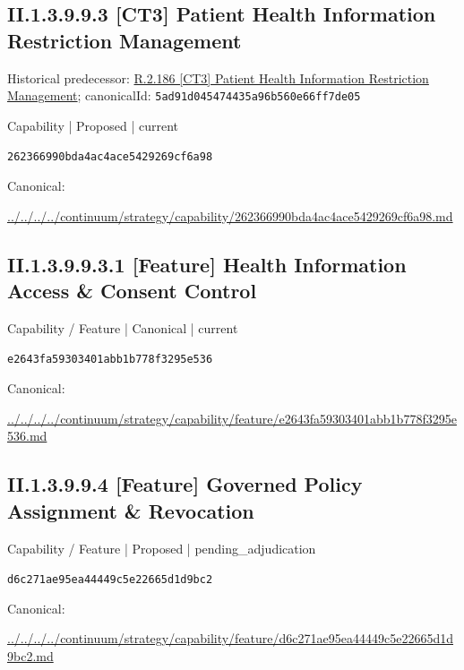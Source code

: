 \documentclass[10pt,a4paper]{article}
\begin{document}
\subsection*{II.1.3.9.9.3 [CT3] Patient Health Information Restriction Management}
Historical predecessor: \hyperref[element-5ad91d045474435a96b560e66ff7de05]{R.2.186 [CT3] Patient Health Information Restriction Management}; canonicalId: \texttt{5ad91d045474435a96b560e66ff7de05}\par
\label{element-262366990bda4ac4ace5429269cf6a98}
{\small Capability | Proposed | current}\par
\texttt{262366990bda4ac4ace5429269cf6a98}\par
Canonical: \par
{\footnotesize\url{../../../../continuum/strategy/capability/262366990bda4ac4ace5429269cf6a98.md}}\par
\subsection*{II.1.3.9.9.3.1 [Feature] Health Information Access \& Consent Control}
\label{element-e2643fa59303401abb1b778f3295e536}
{\small Capability / Feature | Canonical | current}\par
\texttt{e2643fa59303401abb1b778f3295e536}\par
Canonical: \par
{\footnotesize\url{../../../../continuum/strategy/capability/feature/e2643fa59303401abb1b778f3295e536.md}}\par
\subsection*{II.1.3.9.9.4 [Feature] Governed Policy Assignment \& Revocation}
\label{element-d6c271ae95ea44449c5e22665d1d9bc2}
{\small Capability / Feature | Proposed | pending\_adjudication}\par
\texttt{d6c271ae95ea44449c5e22665d1d9bc2}\par
Canonical: \par
{\footnotesize\url{../../../../continuum/strategy/capability/feature/d6c271ae95ea44449c5e22665d1d9bc2.md}}\par
\end{document}
